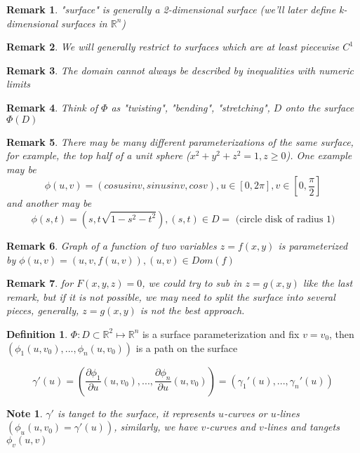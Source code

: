 \documentclass[12pt]{article}
\theoremstyle{plain}
\newtheorem*{remark}{Remark}
\newtheorem*{note}{Note}
\theoremstyle{definition}
\newtheorem{definition}[theorem]{Definition}
\begin{document}
\begin{remark}
	"surface" is generally a 2-dimensional surface (we'll later define k-dimensional surfaces in $\mathbb{R}^n$)
\end{remark}

\begin{remark}
	We will generally restrict to surfaces which are at least piecewise $C^1$
\end{remark}

\begin{remark}
	The domain cannot always be described by inequalities with numeric limits
\end{remark}

\begin{remark}
	Think of $\Phi$ as "twisting", "bending", "stretching", $D$ onto the surface $\Phi(D)$
\end{remark}

\begin{remark}
	There may be many different parameterizations of the same surface, for example, the top half of a unit sphere ($x^2 + y^2 + z^2 = 1, z \geq 0$). One example may be $$\phi (u,v)=(cosu sinv, sinu sinv, cosv), u\in [0,2\pi], v \in [0,\frac{\pi}{2}]$$
	and another may be
	$$\phi (s,t) = (s,t \sqrt{1-s^2 - t^2}), (s,t) \in D = \text{ (circle disk of radius 1)}$$
\end{remark}

\begin{remark}
	Graph of a function of two variables $z=f(x,y)$ is parameterized by $\phi (u,v) = (u,v,f(u,v)), (u,v) \in Dom(f)$
\end{remark}

\begin{remark}
	for $F(x,y,z) = 0$, we could try to sub in $z=g(x,y)$ like the last remark, but if it is not possible, we may need to split the surface into several pieces, generally, $z=g(x,y)$ is not the best approach.
\end{remark}

\begin{definition}
	 $\Phi : D \subset \mathbb{R}^2 \mapsto \mathbb{R}^n$ is a surface parameterization and fix $v=v_0$, then $(\phi_1 (u,v_0),..., \phi_n (u,v_0))$ is a path on the surface
\end{definition}

$$\gamma' (u) = (\frac{\partial \phi_1}{\partial u} (u,v_0),..., \frac{\partial \phi_n}{\partial u} (u,v_0)) = (\gamma_1 ' (u), ..., \gamma_n ' (u) )$$

\begin{note}
	$\gamma '$ is tanget to the surface, it represents $u$-curves or $u$-lines $(\phi_u (u,v_0) = \gamma' (u))$, similarly, we have $v$-curves and $v$-lines and tangets $\phi_v (u,v)$
\end{note}
\end{document}
